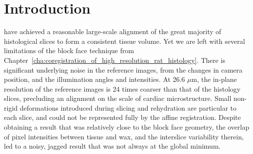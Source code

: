 \section{Introduction} %
\label{sec:introduction}
   have achieved a reasonable large-scale alignment of the great majority of histological slices to form a consistent tissue volume. Yet we are left with several limitations of the block face technique from Chapter~\ref{cha:coregistration_of_high_resolution_rat_histology}. There is significant underlying noise in the reference images, from the changes in camera position, and the illumination angles and intensities. At 26.6 $\mu$m, the in-plane resolution of the reference images is 24 times coarser than that of the histology slices, precluding an alignment on the scale of cardiac microstructure. Small non-rigid deformations introduced during slicing and rehydration are particular to each slice, and could not be represented fully by the affine registration. Despite obtaining a result that was relatively close to the block face geometry, the overlap of pixel intensities between tissue and wax, and the interslice variability therein, led to a noisy, jagged result that was not always at the global minimum.
    
    
